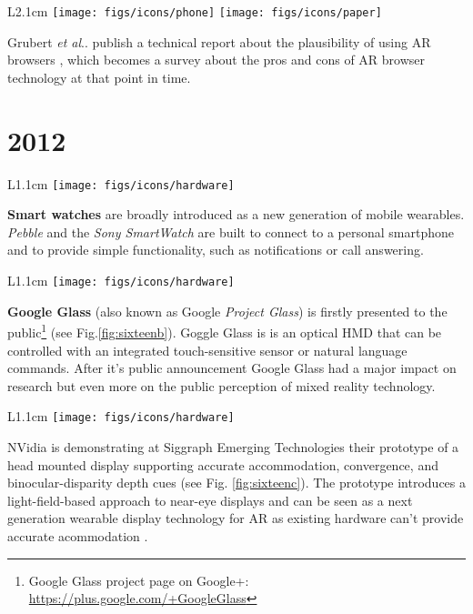 \documentclass[12pt,a4paper]{article}
\makeatletter
\DeclareRobustCommand\onedot{\futurelet\@let@token\@onedot}
\def\@onedot{\ifx\@let@token.\else.\null\fi\xspace}
\def\etal{\emph{et al}\onedot}
\makeatother
\begin{document}
\vspace{0.1in}

\begin{wrapfigure}{L}{2.1cm}
	\vspace{-15pt}	
	\texttt{[image: figs/icons/phone]}	
	\texttt{[image: figs/icons/paper]}
	\vspace{-25pt}		
\end{wrapfigure}
\noindent Grubert \etal publish a technical report about the plausibility of using AR browsers \cite{Grubert11}, which becomes a survey about the pros and cons of AR browser technology at that point in time.

\vspace{-0pt}
\section*{2012}

\begin{wrapfigure}{L}{1.1cm}
	\vspace{-15pt}	
	\texttt{[image: figs/icons/hardware]}
	\vspace{-15pt}		
\end{wrapfigure} 
\textbf{Smart watches} are broadly introduced as a new generation of mobile wearables. \emph{Pebble} and the \emph{Sony SmartWatch} are built to connect to a personal smartphone and to provide simple functionality, such as notifications or call answering.

\vspace{0.1in}

\begin{wrapfigure}{L}{1.1cm}
	\vspace{-15pt}	
	\texttt{[image: figs/icons/hardware]}
	\vspace{-15pt}		
\end{wrapfigure} 
\noindent \textbf{Google Glass} (also known as Google \emph{Project Glass}) is firstly presented to the public\footnote{Google Glass project page on Google+: \url{https://plus.google.com/+GoogleGlass}} (see Fig.\ref{fig:sixteenb}). Goggle Glass is is an optical HMD that can be controlled with an integrated touch-sensitive sensor or natural language commands. After it's public announcement Google Glass had a major impact on research but even more on the public perception of mixed reality technology. 

\vspace{0.1in}

\begin{wrapfigure}{L}{1.1cm}
	\vspace{-15pt}	
	\texttt{[image: figs/icons/hardware]}
	\vspace{-15pt}		
\end{wrapfigure} 
\noindent NVidia is demonstrating at Siggraph Emerging Technologies their prototype of a head mounted display supporting accurate accommodation, convergence, and binocular-disparity depth cues (see Fig. \ref{fig:sixteenc}). The prototype introduces a light-field-based approach to near-eye displays and can be seen as a next generation wearable display technology for AR as existing hardware can't provide accurate acommodation .
\end{document}

